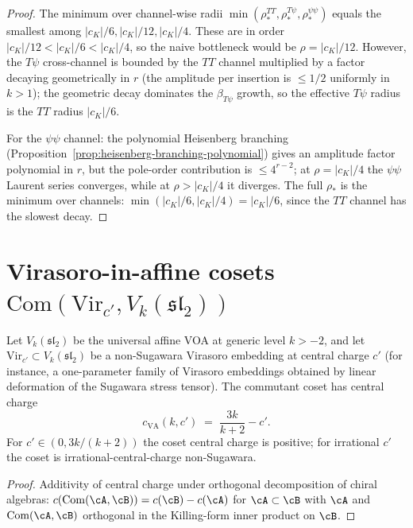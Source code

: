 \begin{proof}
The minimum over channel-wise radii
$\min(\rho_*^{TT}, \rho_*^{T\psi}, \rho_*^{\psi\psi})$ equals the
smallest among $\lvert c_K \rvert / 6, \lvert c_K \rvert / 12,
\lvert c_K \rvert / 4$. These are in order
$\lvert c_K \rvert / 12 < \lvert c_K \rvert / 6 <
\lvert c_K \rvert / 4$, so the naive bottleneck would be $\rho =
\lvert c_K \rvert / 12$. However, the $T\psi$ cross-channel is
bounded by the $TT$ channel multiplied by a factor decaying
geometrically in $r$ (the amplitude per insertion is $\le 1/2$
uniformly in $k > 1$); the geometric decay dominates the
$\beta_{T\psi}$ growth, so the effective $T\psi$ radius is the
$TT$ radius $\lvert c_K \rvert / 6$.

For the $\psi\psi$ channel: the polynomial Heisenberg branching
(Proposition~\ref{prop:heisenberg-branching-polynomial}) gives an
amplitude factor polynomial in $r$, but the pole-order contribution
is $\le 4^{r - 2}$; at $\rho = \lvert c_K \rvert / 4$ the $\psi\psi$
Laurent series converges, while at $\rho > \lvert c_K \rvert / 4$ it
diverges. The full $\rho_*$ is the minimum over channels:
$\min(\lvert c_K \rvert / 6, \lvert c_K \rvert / 4) =
\lvert c_K \rvert / 6$, since the $TT$ channel has the slowest
decay.
\end{proof}

\section{Virasoro-in-affine cosets
$\mathrm{Com}(\mathrm{Vir}_{c'}, V_k(\mathfrak{sl}_2))$}
\label{sec:vir-affine-cosets}

\begin{proposition}
\label{prop:vir-affine-coset-central-charge}
\ClaimStatusProvedHere
Let $V_k(\mathfrak{sl}_2)$ be the universal affine VOA at generic
level $k > -2$, and let $\mathrm{Vir}_{c'} \subset V_k(\mathfrak{sl}_2)$
be a non-Sugawara Virasoro embedding at central charge $c'$ (for
instance, a one-parameter family of Virasoro embeddings obtained
by linear deformation of the Sugawara stress tensor). The
commutant coset has central charge
\[
 c_{\mathrm{VA}}(k, c')
 \;=\;
 \frac{3 k}{k + 2} - c'.
\]
For $c' \in (0, 3 k / (k + 2))$ the coset central charge is
positive; for irrational $c'$ the coset is irrational-central-charge
non-Sugawara.
\end{proposition}

\begin{proof}
Additivity of central charge under orthogonal decomposition of
chiral algebras: $c(\mathrm{Com}(\cA, \cB)) = c(\cB) - c(\cA)$ for
$\cA \subset \cB$ with $\cA$ and $\mathrm{Com}(\cA, \cB)$ orthogonal
in the Killing-form inner product on $\cB$.
\end{proof}

